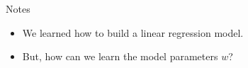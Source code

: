 \begin{frame}

\begin{alertblock}{Notes}
    \begin{itemize}
        \item We learned how to build a linear regression model.
        \item But, how can we learn the model parameters $w$?
    \end{itemize}
\end{alertblock}

\end{frame}

